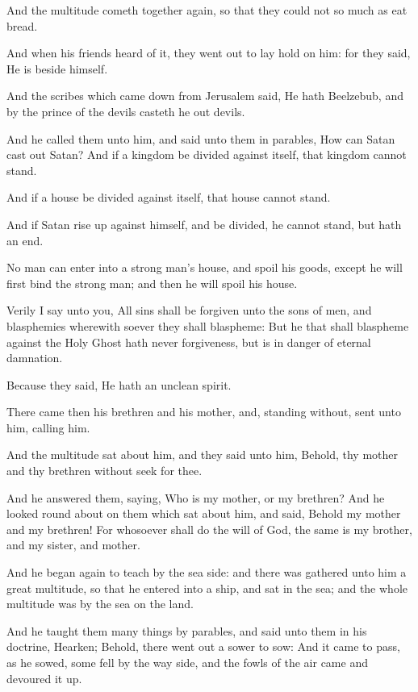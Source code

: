 \Verse And the multitude cometh together again, so that they could not so much as eat bread.

\Verse And when his friends heard of it, they went out to lay hold on him: for they said, He is beside himself.

\Verse And the scribes which came down from Jerusalem said, He hath Beelzebub, and by the prince of the devils casteth he out devils.

\Verse And he called them unto him, and said unto them in parables, How can Satan cast out Satan?  \Verse And if a kingdom be divided against itself, that kingdom cannot stand.

\Verse And if a house be divided against itself, that house cannot stand.

\Verse And if Satan rise up against himself, and be divided, he cannot stand, but hath an end.

\Verse No man can enter into a strong man's house, and spoil his goods, except he will first bind the strong man; and then he will spoil his house.

\Verse Verily I say unto you, All sins shall be forgiven unto the sons of men, and blasphemies wherewith soever they shall blaspheme: \Verse But he that shall blaspheme against the Holy Ghost hath never forgiveness, but is in danger of eternal damnation.

\Verse Because they said, He hath an unclean spirit.

\Verse There came then his brethren and his mother, and, standing without, sent unto him, calling him.

\Verse And the multitude sat about him, and they said unto him, Behold, thy mother and thy brethren without seek for thee.

\Verse And he answered them, saying, Who is my mother, or my brethren?  \Verse And he looked round about on them which sat about him, and said, Behold my mother and my brethren!  \Verse For whosoever shall do the will of God, the same is my brother, and my sister, and mother.


\Chapter
\Verse And he began again to teach by the sea side: and there was gathered unto him a great multitude, so that he entered into a ship, and sat in the sea; and the whole multitude was by the sea on the land.

\Verse And he taught them many things by parables, and said unto them in his doctrine, \Verse Hearken; Behold, there went out a sower to sow: \Verse And it came to pass, as he sowed, some fell by the way side, and the fowls of the air came and devoured it up.

